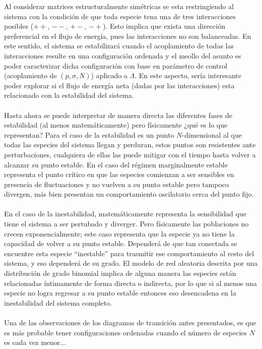 Al considerar matrices estructuralmente simétricas se esta restringiendo al sistema con la condición de que toda especie tena una de tres interacciones posibles ($++$, $--$, $+-$, $-+$). Esto implica que exista una dirección preferencial en el flujo de energía, pues las interacciones no son balanceadas. En este sentido, el sistema se estabilizará cuando el acoplamiento de todas las interacciones resulte en una configuración ordenada y el meollo del asunto es poder caracterizar dicha configuración con base en parámetro de control (acoplamiento de $(p,\sigma, N)$) aplicado a $\Lambda$. En este aspecto, sería interesante poder explorar si el flujo de energía neta (dadas por las interacciones) esta relacionado con la estabilidad del sistema.\\
\\
Hasta ahora se puede interpretar de manera directa las diferentes fases de estabilidad (al menos matemáticamente) pero físicamente ¿qué es lo que representan? Para el caso de la estabilidad es un punto $N$-dimensional al que todas las especies del sistema llegan y perduran, estos puntos son resistentes ante perturbaciones, cualquiera de ellas las puede mitigar con el tiempo hasta volver a alcanzar su punto estable. En el caso del régimen marginalmente estable representa el punto crítico en que las especies comienzan a ser sensibles en presencia de fluctuaciones y no vuelven a su punto estable pero tampoco divergen, más bien presentan un comportamiento oscilatorio cerca del punto fijo. \\
\\
En el caso de la inestabilidad, matemáticamente representa la sensibilidad que tiene el sistema a ser pertubado y diverger. Pero físicamente las poblaciones no crecen exponencialmente; este caso representa que la especie ya no tiene la capacidad de volver a su punto estable. Dependerá de que tan conectada se encuentre esta especie ``inestable'' para trasmitir ese comportamiento al resto del sistema, y eso dependerá de su grado. El modelo de red aleatoria descrita por una distribución de grado binomial implica de alguna manera las especies están relacionadas íntimamente de forma directa o indirecta, por lo que si al menos una especie no logra regresar a su punto estable entonces eso desencadena en la inestabilidad del sistema completo.\\
\\
Una de las observaciones de los diagramas de transición antes presentados, es que es más probable tener configuraciones ordenadas cuando el número de especies $N$ es cada vez menor...
\newpage
